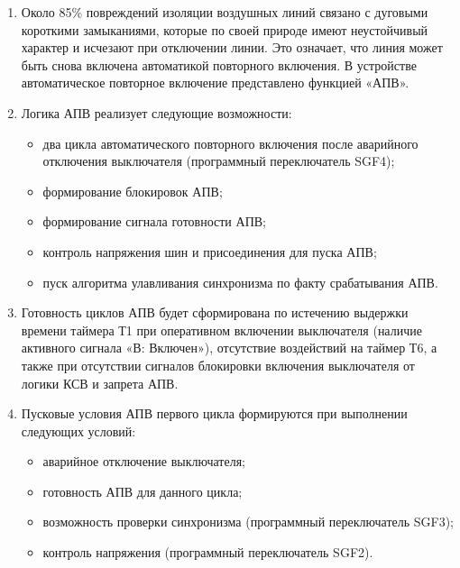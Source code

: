 
\color{black}

\begin{enumerate}

\item
Около 85\% повреждений изоляции воздушных линий связано с дуговыми короткими замыканиями, которые по своей природе имеют неустойчивый характер и исчезают при отключении линии. Это означает, что линия может быть снова включена автоматикой повторного включения. В устройстве автоматическое повторное включение представлено функцией «АПВ».

\item
Логика АПВ реализует следующие возможности:
\begin{itemize}
    \item два цикла автоматического повторного включения после аварийного отключения выключателя (программный переключатель SGF4);
    \item формирование блокировок АПВ;
    \item формирование сигнала готовности АПВ;
    \item контроль напряжения шин и присоединения для пуска АПВ;
    \item пуск алгоритма улавливания синхронизма по факту срабатывания АПВ.
\end{itemize}

\item
Готовность циклов АПВ будет сформирована по истечению выдержки времени таймера Т1 при оперативном включении выключателя (наличие активного сигнала «В: Включен»), отсутствие воздействий на таймер Т6, а также при отсутствии сигналов блокировки включения выключателя от логики КСВ и запрета АПВ.

\item
Пусковые условия АПВ первого цикла формируются при выполнении следующих условий:
\begin{itemize}
    \item аварийное отключение выключателя; 
    \item готовность АПВ для данного цикла; 
    \item возможность проверки синхронизма (программный переключатель SGF3);
    \item контроль напряжения (программный переключатель SGF2).
\end{itemize}


\end{enumerate}
